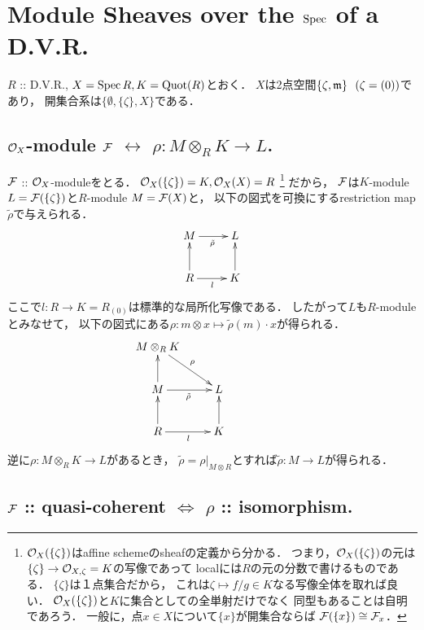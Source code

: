 \documentclass[a4paper]{jsarticle}
\begin{document}
\section{Module Sheaves over the $\operatorname{Spec}$ of a D.V.R.} %
    $R$ :: D.V.R., $X=\operatorname{Spec} R, K=\operatorname{Quot}(R)$とおく．
    $X$は2点空間$\{ \zeta, \mathfrak{m} \}~~(\zeta=(0))$であり，
    開集合系は$\{ \emptyset, \{\zeta\}, X \}$である．

    \subsection{$\mathcal{O}_X$-module $\mathcal{F}$ $\leftrightarrow$ $\rho: M \otimes_R K \to L$.}
    $\mathcal{F}$ :: $\mathcal{O}_X$-moduleをとる．
    $\mathcal{O}_X(\{\zeta\})=K,\mathcal{O}_X(X)=R$
    \footnote
    {
        $\mathcal{O}_X(\{\zeta\})$はaffine schemeのsheafの定義から分かる．
        つまり，$\mathcal{O}_X(\{\zeta\})$の元は
        $\{\zeta\} \to \mathcal{O}_{X,\zeta}=K$の写像であって
        localには$R$の元の分数で書けるものである．
        $\{\zeta\}$は１点集合だから，
        これは$\zeta \mapsto f/g \in K$なる写像全体を取れば良い．
        $\mathcal{O}_X(\{\zeta\})$と$K$に集合としての全単射だけでなく
        同型もあることは自明であろう．
        一般に，点$x \in X$について$\{x\}$が開集合ならば
        $\mathcal{F}(\{x\}) \cong \mathcal{F}_{x}$．
    }
    だから，
    $\mathcal{F}$は$K$-module $L=\mathcal{F}(\{\zeta\})$と$R$-module $M=\mathcal{F}(X)$と，
    以下の図式を可換にするrestriction map $\tilde{\rho}$で与えられる．
    \[
    \xymatrix
    {
        M \ar[r]_{\tilde{\rho}}& L \\
        R \ar[u]\ar[r]_{l}& K \ar[u]
    }
    \]
    ここで$l: R \to K=R_{(0)}$は標準的な局所化写像である．
    したがって$L$も$R$-moduleとみなせて，
    以下の図式にある$\rho: m \otimes x \mapsto \tilde{\rho}(m) \cdot x$が得られる．
    \[
    \xymatrix
    {
        M \otimes_R K \ar[rd]^{\rho} & {} \\
        M \ar[r]_{\tilde{\rho}} \ar[u]& L \\
        R \ar[u]\ar[r]_{l}& K \ar[u]
    }
    \hspace{2cm}
    \]
    逆に$\rho: M \otimes_R K \to L$があるとき，
    $\tilde{\rho}=\rho|_{M \otimes R}$とすれば$\tilde{\rho}: M \to L$が得られる．

    \subsection{$\mathcal{F}$ :: quasi-coherent $\iff$ $\rho$ :: isomorphism.}
\end{document}
